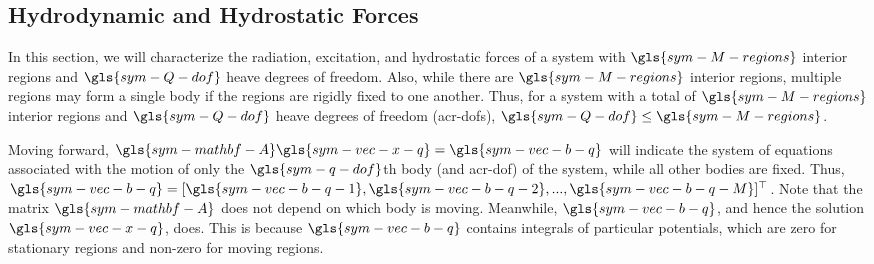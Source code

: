 \documentclass[lineno]{JFM-FLM_Au}
\begin{document}
\subsection{Hydrodynamic and Hydrostatic Forces}\label{jfm:sec:Hydrodynamic Forces}
In this section, we will characterize the radiation, excitation, and hydrostatic forces of a system with $\gls{sym-M-regions}$ interior regions and $\gls{sym-Q-dof}$ heave degrees of freedom.
Also, while there are $\gls{sym-M-regions}$ interior regions, multiple regions may form a single body if the regions are rigidly fixed to one another.
Thus, for a system with a total of $\gls{sym-M-regions}$ interior regions and $\gls{sym-Q-dof}$ heave degrees of freedom (\glspl{acr-dof}), $\gls{sym-Q-dof} \le \gls{sym-M-regions}$. 

Moving forward, $\gls{sym-mathbf-A} \gls{sym-vec-x-q} = \gls{sym-vec-b-q}$ will indicate the system of equations associated with the motion of only the $\gls{sym-q-dof}$th body (and \gls{acr-dof}) of the system, while all other bodies are fixed.
Thus, $\gls{sym-vec-b-q}=[\gls{sym-vec-b-q-1},\gls{sym-vec-b-q-2},...,\gls{sym-vec-b-q-M}]^{\top}$. Note that the matrix $\gls{sym-mathbf-A}$ does not depend on which body is moving.
Meanwhile, $\gls{sym-vec-b-q}$, and hence the solution $\gls{sym-vec-x-q}$, does.
This is because $\gls{sym-vec-b-q}$ contains integrals of particular potentials, which are zero for stationary regions and non-zero for moving regions.
\end{document}
